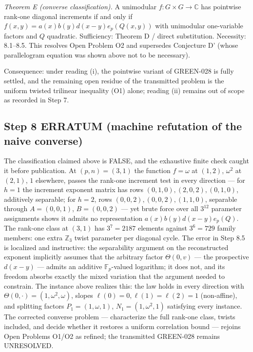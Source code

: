 \documentclass[11pt]{article}
\begin{document}
\emph{Theorem E (converse classification).} A unimodular
$f:G\times G\to\mathbb{C}$ has pointwise rank-one diagonal increments if and
only if $f(x,y)=a(x)b(y)d(x-y)e_p(Q(x,y))$ with unimodular one-variable
factors and $Q$ quadratic. Sufficiency: Theorem D / direct substitution.
Necessity: 8.1--8.5. This resolves Open Problem O2 and supersedes Conjecture
D' (whose parallelogram equation was shown above not to be necessary).

Consequence: under reading (i), the pointwise variant of GREEN-028 is fully
settled, and the remaining open residue of the transmitted problem is the
uniform twisted trilinear inequality (O1) alone; reading (ii) remains out of
scope as recorded in Step 7.

\subsection*{Step 8 ERRATUM (machine refutation of the naive converse)}

The classification claimed above is FALSE, and the exhaustive finite check
caught it before publication. At $(p,n)=(3,1)$ the function
$f=\omega$ at $(1,2)$, $\omega^{2}$ at $(2,1)$, $1$ elsewhere, passes the
rank-one increment test in every direction — for $h=1$ the increment
exponent matrix has rows $(0,1,0),(2,0,2),(0,1,0)$, additively separable;
for $h=2$, rows $(0,0,2),(0,0,2),(1,1,0)$, separable through
$A=(0,0,1)$, $B=(0,0,2)$ — yet brute force over all $3^{12}$ parameter
assignments shows it admits no representation
$a(x)b(y)d(x-y)e_p(Q)$. The rank-one class at $(3,1)$ has
$3^{7}=2187$ elements against $3^{6}=729$ family members: one extra
$\mathbb{Z}_3$ twist parameter per diagonal cycle. The error in Step 8.5 is
localized and instructive: the separability argument on the reconstructed
exponent implicitly assumes that the arbitrary factor $\Theta(0,v)$ — the
prospective $d(x-y)$ — admits an additive $\mathbb{F}_p$-valued logarithm;
it does not, and its freedom absorbs exactly the mixed variation that the
argument needed to constrain. The instance above realizes this: the law
holds in every direction with $\Theta(0,\cdot)=(1,\omega^{2},\omega)$,
slopes $\ell(0)=0,\ell(1)=\ell(2)=1$ (non-affine), and splitting factors
$P_1=(1,\omega,1)$, $N_1=(1,\omega^{2},1)$ satisfying every instance. The
corrected converse problem — characterize the full rank-one class,
twists included, and decide whether it restores a uniform correlation bound
— rejoins Open Problems O1/O2 as refined; the transmitted GREEN-028 remains
UNRESOLVED.
\end{document}
